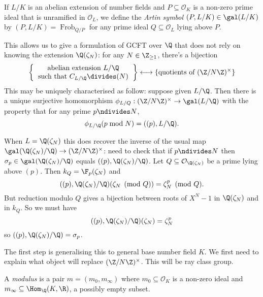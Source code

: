 \documentclass[a4paper]{article}
\renewcommand*{\O}{\mathcal{O}}
\DeclareMathOperator{\Frob}{Frob} %
\begin{document}
\begin{definition}
  If \(L/K\) is an abelian extension of number fields and \(P \subseteq \O_K\) is a non-zero prime ideal that is unramified in \(\O_L\), we define the \emph{Artin symbol} \((P, L/K) \in \gal(L/K)\) by \((P, L/K) = \Frob_{Q/P}\) for any prime ideal \(Q \subseteq \O_L\) lying above \(P\).
\end{definition}

This allows us to give a formulation of GCFT over \(\Q\) that does not rely on knowing the extension \(\Q(\zeta_N)\): for any \(N \in \Z_{\geq 1}\), there's a bijection
\[
  \left\{
    \begin{tabular}{c}
      abelian extension \(L/\Q\) \\
      such that \(C_{L/\Q} \divides (N)\)
    \end{tabular}
  \right\}
  \longleftrightarrow
  \{\text{quotients of } (\Z/N\Z)^\times\}
\]
This may be uniquely characterised as follow: suppose given \(L/\Q\). Then there is a unique surjective homomorphism \(\phi_{L/Q}: (\Z/N\Z)^\times \to \gal(L/\Q)\) with the property that for any prime \(p \ndivides N\),
\[
  \phi_{L/\Q}(p \bmod N) = ((p), L/\Q).
\]

\begin{remark}
  When \(L = \Q(\zeta_N)\) this does recover the inverse of the usual map \(\gal(\Q(\zeta_N)/\Q) \to (\Z/N\Z)^\times\): need to check that if \(p \ndivides N\) then \(\sigma_p \in \gal(\Q(\zeta_N)/\Q)\) equals \(((p), \Q(\zeta_N)/\Q)\). Let \(Q \subseteq \O_{\Q(\zeta_N)}\) be a prime lying above \((p)\). Then \(k_Q = \F_p(\zeta_N)\) and
  \[
    ((p), \Q(\zeta_N)/\Q) (\zeta_N \pmod Q) = \zeta_N^p \pmod Q.
  \]
  But reduction modulo \(Q\) gives a bijection between roots of \(X^N - 1\) in \(\Q(\zeta_N)\) and in \(k_Q\). So we must have
  \[
    ((p), \Q(\zeta_N)/\Q)(\zeta_N) = \zeta_N^p
  \]
  so \(((p), \Q(\zeta_N)/\Q) = \sigma_p\).
\end{remark}

The first step is generalising this to general base number field \(K\). We first need to explain what object will replace \((\Z/N\Z)^\times\). This will be ray class group.

\begin{definition}[modulus]
  A \emph{modulus} is a pair \(m = (m_0, m_\infty)\) where \(m_0 \subseteq \O_K\) is a non-zero ideal and \(m_\infty \subseteq \Hom_\Q(K, \R)\), a possibly empty subset.
\end{definition}
\end{document}
